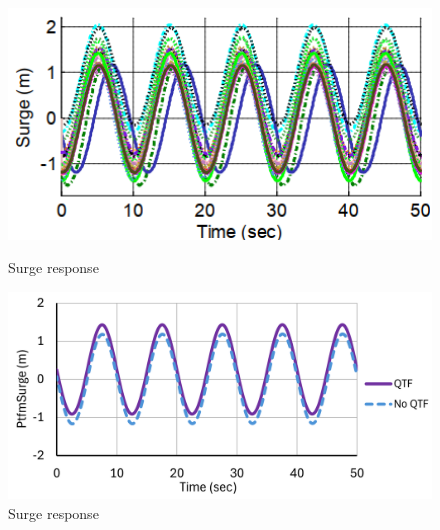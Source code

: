 \documentclass[a4paper, 11pt]{article}
\begin{document}
\begin{figure}[H]
    \begin{minipage}{0.48\textwidth}
        \centering
        \includegraphics[width=1\textwidth]{2.1_surge.png}
        \caption{\small Surge response \cite{Robertson2014}}
        \label{fig:2.1_surge}
    \end{minipage}
    \hfill
    \begin{minipage}{0.51\textwidth}
        \centering
        \includegraphics[width=1\textwidth]{2.1_surge_mine.png}
        \caption{\small Surge response}
        \label{fig:2.1_surge_mine}
    \end{minipage}
\end{figure}
\vspace{-0.2cm}
\end{document}

